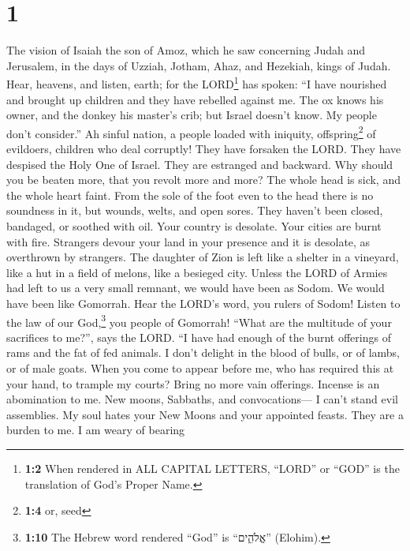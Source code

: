 \hypertarget{section}{%
\section{1}\label{section}}

 The vision of Isaiah the son of Amoz, which he saw
concerning Judah and Jerusalem, in the days of Uzziah, Jotham, Ahaz, and
Hezekiah, kings of Judah.  Hear, heavens, and listen,
earth; for the LORD\footnote{\textbf{1:2} When rendered in ALL CAPITAL
  LETTERS, ``LORD'' or ``GOD'' is the translation of God's Proper Name.}
has spoken: ``I have nourished and brought up children and they have
rebelled against me.  The ox knows his owner, and the
donkey his master's crib; but Israel doesn't know. My people don't
consider.''  Ah sinful nation, a people loaded with
iniquity, offspring\footnote{\textbf{1:4} or, seed} of evildoers,
children who deal corruptly! They have forsaken the LORD. They have
despised the Holy One of Israel. They are estranged and backward.
 Why should you be beaten more, that you revolt more and
more? The whole head is sick, and the whole heart faint. 
From the sole of the foot even to the head there is no soundness in it,
but wounds, welts, and open sores. They haven't been closed, bandaged,
or soothed with oil.  Your country is desolate. Your
cities are burnt with fire. Strangers devour your land in your presence
and it is desolate, as overthrown by strangers.  The
daughter of Zion is left like a shelter in a vineyard, like a hut in a
field of melons, like a besieged city.  Unless the LORD of
Armies had left to us a very small remnant, we would have been as Sodom.
We would have been like Gomorrah.  Hear the LORD's word,
you rulers of Sodom! Listen to the law of our God,\footnote{\textbf{1:10}
  The Hebrew word rendered ``God'' is ``אֱלֹהִ֑ים'' (Elohim).} you
people of Gomorrah!  ``What are the multitude of your
sacrifices to me?'', says the LORD. ``I have had enough of the burnt
offerings of rams and the fat of fed animals. I don't delight in the
blood of bulls, or of lambs, or of male goats.  When you
come to appear before me, who has required this at your hand, to trample
my courts?  Bring no more vain offerings. Incense is an
abomination to me. New moons, Sabbaths, and convocations--- I can't
stand evil assemblies.  My soul hates your New Moons and
your appointed feasts. They are a burden to me. I am weary of bearing
